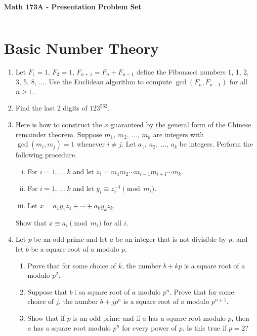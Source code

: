 \documentclass[11pt,letterpaper]{article}
\begin{document}
\begin{center}
{\bf \Large Math 173A - Presentation Problem Set}
\vspace{0.2cm}
\hrule
\end{center}



\section{Basic Number Theory}
\begin{enumerate}
    \item Let $F_1 = 1$, $F_2 = 1$, $F_{n+1} = F_n + F_{n-1}$ define the Fibonacci numbers 1, 1, 2, 3, 5, 8, $\ldots$.
    Use the Euclidean algorithm to compute $\gcd(F_n, F_{n-1})$ for all $n\geq 1$.

    \item Find the last 2 digits of $123^{562}$.

    \item Here is how to construct the $x$ guaranteed by the general form of the Chinese remainder theorem.
    Suppose $m_1,\ m_2,\ \ldots,\ m_k$ are integers with $\gcd(m_i, m_j) = 1$ whenever $i\neq j$.
    Let $a_1,\ a_2,\ \ldots,\ a_k$ be integers.
    Perform the following procedure.
    \begin{enumerate}[(i)]
        \item For $i= 1,\ldots, k$ and let $z_i = m_1m_2\cdots m_{i-1}m_{i+1}\cdots m_k$.
        \item For $i= 1, \ldots, k$ and let $y_i \equiv z_i^{-1}\pmod m_i$.
        \item Let $x = a_1y_1z_1 + \cdots + a_ky_kz_k$.
    \end{enumerate}
    Show that $x\equiv a_i\pmod{m_i}$ for all $i$.

    \item Let $p$ be an odd prime and let $a$ be an integer that is not divisible by $p$, and let $b$ be a square root of $a$ modulo $p$.
    \begin{enumerate}
        \item Prove that for some choice of $k$, the number $b+kp$ is a square root of $a$ modulo $p^2$.
        \item Suppose that $b$ i sa square root of $a$ modulo $p^n$.
        Prove that for some choice of $j$, the number $b+jp^n$ is a square root of $a$ modulo $p^{n+1}$.
        \item Show that if $p$ is an odd prime and if $a$ has a square root modulo $p$, then $a$ has a square root modulo $p^n$ for every power of $p$.
        Is this true if $p=2$?
    \end{enumerate}


\end{enumerate}
\end{document}
